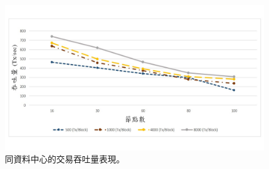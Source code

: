 \begin{figure}[htp]
\centering
\includegraphics[scale=0.50]{images/61.jpg}
\caption{同資料中心的交易吞吐量表現。}
\label{i:byz-latency}
\end{figure}
